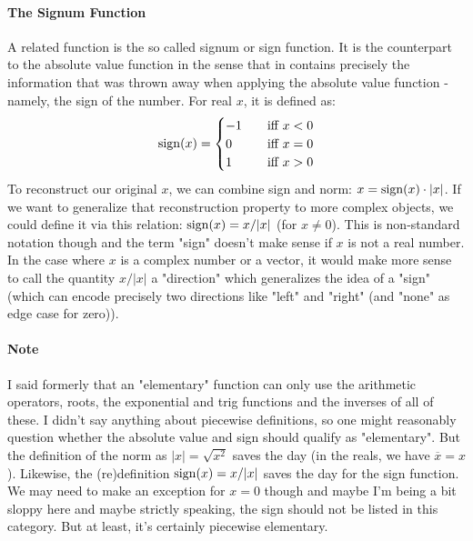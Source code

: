 \paragraph{The Signum Function}
A related function is the so called signum or sign function. It is the counterpart to the absolute value function in the sense that in contains precisely the information that was thrown away when applying the absolute value function - namely, the sign of the number. For real $x$, it is defined as:
\begin{equation}
\operatorname{sign}(x) = 
\begin{cases} 
 -1 \quad & \text{iff } x < 0 \\
  0 \quad & \text{iff } x = 0 \\ 
  1 \quad & \text{iff } x > 0 \\
\end{cases} 
\end{equation}
To reconstruct our original $x$, we can combine sign and norm: $x = \operatorname{sign}(x) \cdot |x|$. If we want to generalize that reconstruction property to more complex objects, we could define it via this relation: $\operatorname{sign}(x) = x / |x|$ (for $x \neq 0$). This is non-standard notation though and the term "sign" doesn't make sense if $x$ is not a real number. In the case where $x$ is a complex number or a vector, it would make more sense to call the quantity $x / |x|$ a "direction" which generalizes the idea of a "sign" (which can encode precisely two directions like "left" and "right" (and "none" as edge case for zero)).

\paragraph{Note}
I said formerly that an "elementary" function can only use the arithmetic operators, roots, the exponential and trig functions and the inverses of all of these. I didn't say anything about piecewise definitions, so one might reasonably question whether the absolute value and sign should qualify as "elementary". But the definition of the norm as $|x| = \sqrt{x^2}$ saves the day (in the reals, we have $\overline{x} = x$). Likewise, the (re)definition $\operatorname{sign}(x) = x / |x|$ saves the day for the sign function. We may need to make an exception for $x = 0$ though and maybe I'm being a bit sloppy here and maybe strictly speaking, the sign should not be listed in this category. But at least, it's certainly piecewise elementary.



